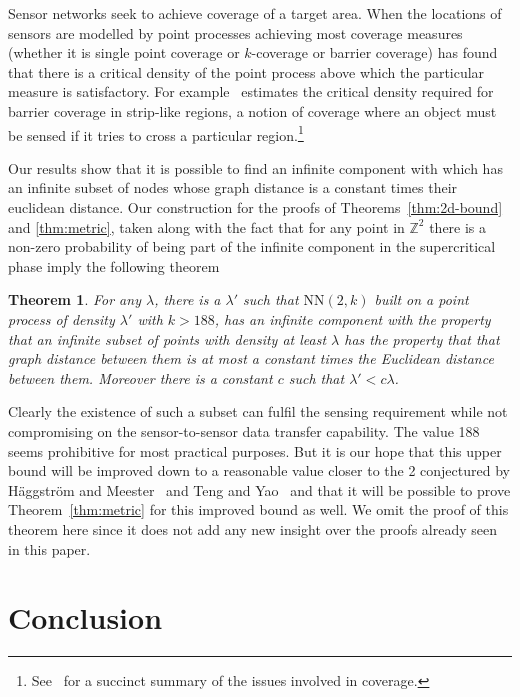 \documentclass[11pt]{article}
\newtheorem{theorem}{Theorem}[section]
\def\ZZ{\mathbb{Z}}
\def\NN{\mbox{NN}}
\begin{document}
Sensor networks seek to achieve coverage of a target area. When the
locations of sensors are modelled by point processes achieving most
coverage measures (whether it is single point coverage or $k$-coverage
or barrier coverage) has found that there is a critical density of the
point process above which the particular measure is satisfactory. For
example~\cite{ballister-mobicom:2007} estimates the critical density
required for barrier coverage in strip-like regions, a notion of
coverage where an object must be sensed if it tries to cross a
particular region.\footnote{See~\cite[Chap 13.2]{karl:2005} for a
succinct summary of the issues involved in coverage.}

Our results show that it is possible to find an infinite component
with which has an infinite subset of nodes whose graph distance is a
constant times their euclidean distance. Our construction for the
proofs of Theorems~\ref{thm:2d-bound} and \ref{thm:metric}, taken
along with the fact that for any point in $\ZZ^2$ there is a non-zero
probability of being part of the infinite component in the
supercritical phase imply the following theorem

\begin{theorem}
\label{thm:sensor-coverage}
For any $\lambda$, there is a $\lambda'$ such that $\NN(2,k)$ built on
a point process of density $\lambda'$ with $k>188$, has an infinite
component with the property that an infinite subset of points with
density at least $\lambda$ has the property that that graph distance
between them is at most a constant times the Euclidean distance
between them. Moreover there is a constant $c$ such that $\lambda' < c
\lambda$. 
\end{theorem}

Clearly the existence of such a subset can fulfil the sensing
requirement while not compromising on the sensor-to-sensor data
transfer capability.  The value 188 seems prohibitive for most
practical purposes. But it is our hope that this upper bound will be
improved down to a reasonable value closer to the 2 conjectured by
H\"aggstr\"om and Meester~\cite{haggstrom-rsa:1996} and Teng and
Yao~\cite{teng-algorithmica:2007} and that it will be possible to
prove Theorem~\ref{thm:metric} for this improved bound as well. We
omit the proof of this theorem here since it does not add any new
insight over the proofs already seen in this paper.






\section{Conclusion}
\label{sec:conclusion}
\end{document}
